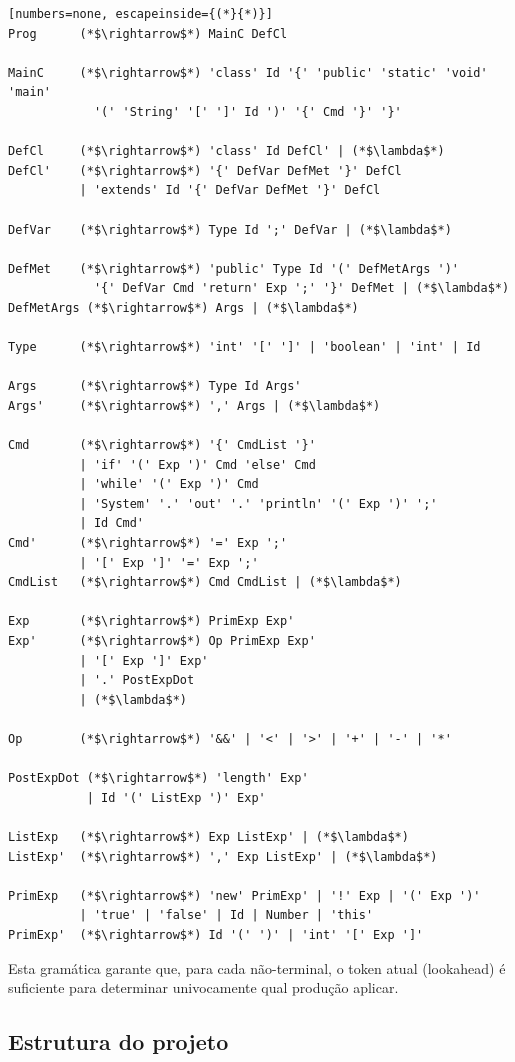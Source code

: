 \documentclass[a4paper, 12pt]{article}
\begin{document}
\begin{lstlisting}[numbers=none, escapeinside={(*}{*)}]
Prog      (*$\rightarrow$*) MainC DefCl

MainC     (*$\rightarrow$*) 'class' Id '{' 'public' 'static' 'void' 'main'
            '(' 'String' '[' ']' Id ')' '{' Cmd '}' '}'

DefCl     (*$\rightarrow$*) 'class' Id DefCl' | (*$\lambda$*)
DefCl'    (*$\rightarrow$*) '{' DefVar DefMet '}' DefCl
          | 'extends' Id '{' DefVar DefMet '}' DefCl

DefVar    (*$\rightarrow$*) Type Id ';' DefVar | (*$\lambda$*)

DefMet    (*$\rightarrow$*) 'public' Type Id '(' DefMetArgs ')'
            '{' DefVar Cmd 'return' Exp ';' '}' DefMet | (*$\lambda$*)
DefMetArgs (*$\rightarrow$*) Args | (*$\lambda$*)

Type      (*$\rightarrow$*) 'int' '[' ']' | 'boolean' | 'int' | Id

Args      (*$\rightarrow$*) Type Id Args'
Args'     (*$\rightarrow$*) ',' Args | (*$\lambda$*)

Cmd       (*$\rightarrow$*) '{' CmdList '}'
          | 'if' '(' Exp ')' Cmd 'else' Cmd
          | 'while' '(' Exp ')' Cmd
          | 'System' '.' 'out' '.' 'println' '(' Exp ')' ';'
          | Id Cmd'
Cmd'      (*$\rightarrow$*) '=' Exp ';'
          | '[' Exp ']' '=' Exp ';'
CmdList   (*$\rightarrow$*) Cmd CmdList | (*$\lambda$*)

Exp       (*$\rightarrow$*) PrimExp Exp'
Exp'      (*$\rightarrow$*) Op PrimExp Exp'
          | '[' Exp ']' Exp'
          | '.' PostExpDot
          | (*$\lambda$*)

Op        (*$\rightarrow$*) '&&' | '<' | '>' | '+' | '-' | '*'

PostExpDot (*$\rightarrow$*) 'length' Exp'
           | Id '(' ListExp ')' Exp'

ListExp   (*$\rightarrow$*) Exp ListExp' | (*$\lambda$*)
ListExp'  (*$\rightarrow$*) ',' Exp ListExp' | (*$\lambda$*)

PrimExp   (*$\rightarrow$*) 'new' PrimExp' | '!' Exp | '(' Exp ')'
          | 'true' | 'false' | Id | Number | 'this'
PrimExp'  (*$\rightarrow$*) Id '(' ')' | 'int' '[' Exp ']'
\end{lstlisting}

Esta gram\'atica garante que, para cada n\~ao-terminal, o token atual (lookahead) \'e suficiente para determinar univocamente qual produ\c{c}\~ao aplicar.

\subsection{Estrutura do projeto}
\end{document}
